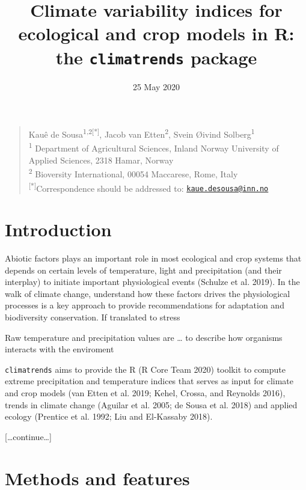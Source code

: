 \documentclass[
]{article}
\title{Climate variability indices for ecological and crop models in R:
the \texttt{climatrends} package}
\author{}
\date{\vspace{-2.5em}25 May 2020}
\begin{document}
\maketitle

\begin{quote}
Kauê de Sousa\textsuperscript{1,2{[}*{]}}, Jacob van
Etten\textsuperscript{2}, Svein Øivind Solberg\textsuperscript{1}\\
\textsuperscript{1} Department of Agricultural Sciences, Inland Norway
University of Applied Sciences, 2318 Hamar, Norway\\
\textsuperscript{2} Bioversity International, 00054 Maccarese, Rome,
Italy\\
\textsuperscript{{[}*{]}}Correspondence should be addressed to:
\href{mailto:kaue.desousa@inn.no}{\nolinkurl{kaue.desousa@inn.no}}
\end{quote}

\hfill\break

\hypertarget{introduction}{%
\section{Introduction}\label{introduction}}

Abiotic factors plays an important role in most ecological and crop
systems that depends on certain levels of temperature, light and
precipitation (and their interplay) to initiate important physiological
events (Schulze et al. 2019). In the walk of climate change, understand
how these factors drives the physiological processes is a key approach
to provide recommendations for adaptation and biodiversity conservation.
If translated to stress

Raw temperature and precipitation values are \ldots{} to describe how
organisms interacts with the enviroment

\texttt{climatrends} aims to provide the R (R Core Team 2020) toolkit to
compute extreme precipitation and temperature indices that serves as
input for climate and crop models (van Etten et al. 2019; Kehel, Crossa,
and Reynolds 2016), trends in climate change (Aguilar et al. 2005; de
Sousa et al. 2018) and applied ecology (Prentice et al. 1992; Liu and
El-Kassaby 2018).

{[}\ldots continue\ldots{]}

\hypertarget{methods-and-features}{%
\section{Methods and features}\label{methods-and-features}}
\end{document}
